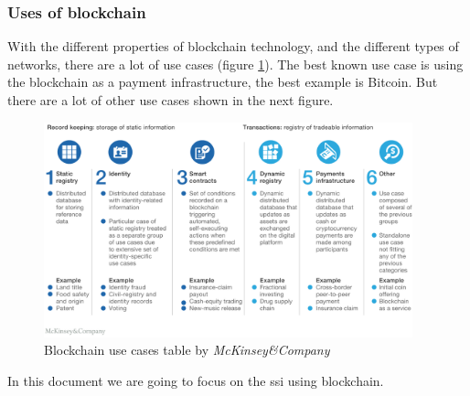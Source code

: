 \subsubsection{Uses of blockchain}
With the different properties of blockchain technology, and the different types of networks, there are a lot of use cases (figure \ref{fig:blockchain_uses}). The best known use case is using the blockchain as a payment infrastructure, the best example is Bitcoin. But there are a lot of other use cases shown in the next figure.\\
\begin{figure}[h]
    \centering
    \includegraphics[width=0.95\textwidth]{images/State of the Art/blockchain/Blockchain-uses.png}
    \caption{Blockchain use cases table by \textit{McKinsey\&Company}}
    \label{fig:blockchain_uses}
\end{figure}

In this document we are going to focus on the \acrfull{ssi} using blockchain.
